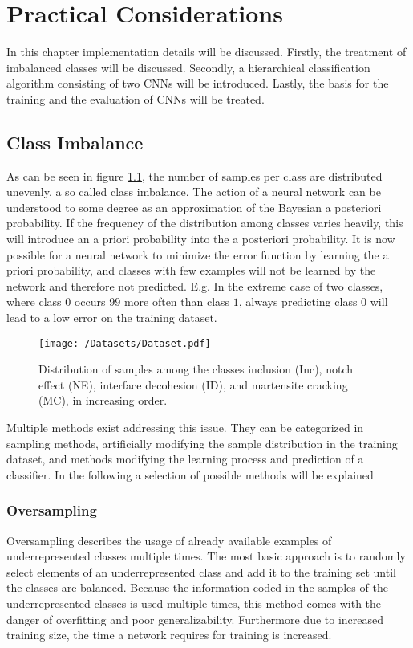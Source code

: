 \chapter{Practical Considerations}
\label{cha:PracticalConsiderations}

In this chapter implementation details will be discussed. Firstly, the treatment of imbalanced classes will be discussed. Secondly, a hierarchical classification algorithm consisting of two CNNs will be introduced. Lastly, the basis for the training and the evaluation of CNNs will be treated.

\section{Class Imbalance}

As can be seen in figure \ref{fig:datasets}, the number of samples per class are distributed unevenly, a so called class imbalance. The action of a neural network can be understood to some degree as an approximation of the Bayesian a posteriori probability. If the frequency of the distribution among classes varies heavily, this will introduce an a priori probability into the a posteriori probability. It is now possible for a neural network to minimize the error function by learning the a priori probability, and classes with few examples will not be learned by the network and therefore not predicted. E.g. In the extreme case of two classes, where class $0$ occurs $99$ more often than class $1$, always predicting class $0$ will lead to a low error on the training dataset. \\

\begin{figure}[H]
\centering
\texttt{[image: /Datasets/Dataset.pdf]}
\caption{Distribution of samples among the classes inclusion (Inc), notch effect (NE), interface decohesion (ID), and martensite cracking (MC), in increasing order.}
\label{fig:datasets}
\end{figure}

Multiple methods exist addressing this issue. They can be categorized in sampling methods, artificially modifying the sample distribution in the training dataset, and methods modifying the learning process and prediction of a classifier. In the following a selection of possible methods will be explained

\subsection{Oversampling}
Oversampling describes the usage of already available examples of underrepresented classes multiple times. The most basic approach is to randomly select elements of an underrepresented class and add it to the training set until the classes are balanced. Because the information coded in the samples of the underrepresented classes is used multiple times, this method comes with the danger of overfitting and poor generalizability. Furthermore due to increased training size, the time a network requires for training is increased. 

